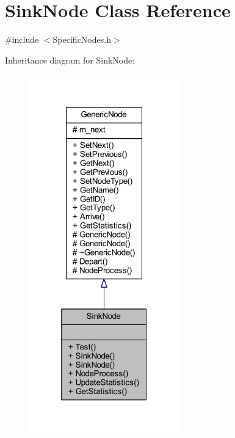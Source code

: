 \hypertarget{class_sink_node}{}\section{Sink\+Node Class Reference}
\label{class_sink_node}


{\ttfamily \#include $<$Specific\+Nodes.\+h$>$}



Inheritance diagram for Sink\+Node\+:
\nopagebreak
\begin{figure}[H]
\begin{center}
\leavevmode
\includegraphics[width=184pt]{class_sink_node__inherit__graph}
\end{center}
\end{figure}


